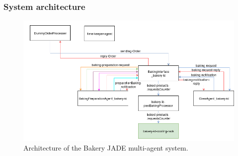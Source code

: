 \documentclass{beamer}
\begin{document}
		\begin{frame}
			\frametitle{System architecture}
			\begin{figure} \vspace{-1cm}
				\centering
				\includegraphics[scale=0.38]{images/bakingStage.png}
				\caption{Architecture of the Bakery JADE multi-agent system.}
				\label{fig:architecture}
			\end{figure}
		\end{frame}
		
\end{document}

